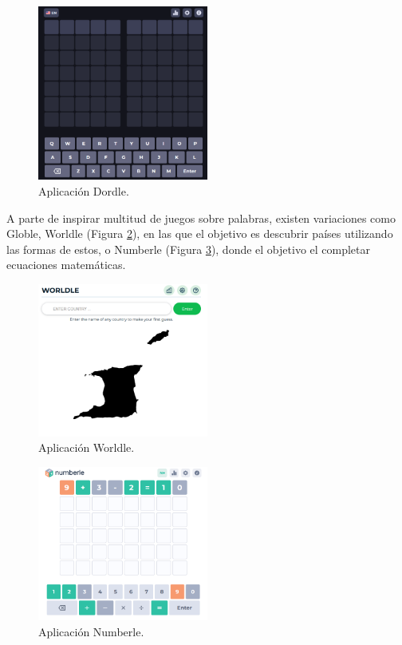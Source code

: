 \begin{figure}
	\centering
	\includegraphics[clip=true,width=0.5\textwidth]{images/dordle.png}
	\caption{Aplicación Dordle.}
	\label{fig:dordle_app}
\end{figure}


A parte de inspirar multitud de juegos sobre palabras, existen variaciones como Globle, Worldle (Figura \ref{fig:worldle_app}), en las que el objetivo es descubrir países utilizando las formas de estos, o Numberle (Figura \ref{fig:numberle_app}), donde el objetivo el completar ecuaciones matemáticas.

\begin{figure}
	\centering
	\includegraphics[clip=true,width=0.5\textwidth]{images/worldle.png}
	\caption{Aplicación Worldle.}
	\label{fig:worldle_app}
\end{figure}

\begin{figure}
	\centering
	\includegraphics[clip=true,width=0.5\textwidth]{images/numberle.png}
	\caption{Aplicación Numberle.}
	\label{fig:numberle_app}
\end{figure}



